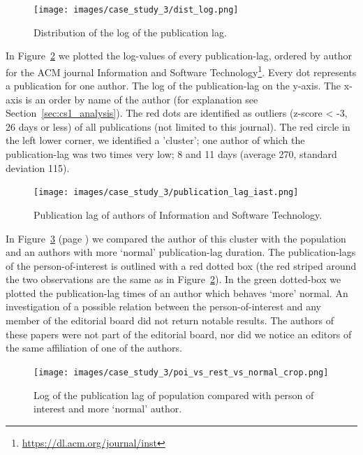 \documentclass{ou-report}
\begin{document}
\begin{figure}[ht]
    \centering
    \texttt{[image: images/case\_study\_3/dist\_log.png]}
    \caption{Distribution of the log of the publication lag.}
    \label{fig:publication_lag_dist_log}
\end{figure}

In Figure~\ref{fig:cs3_publag_iast} we plotted the log-values of every
publication-lag, ordered by author for the ACM journal Information and 
Software Technology\footnote{\url{https://dl.acm.org/journal/inst}}. 
Every dot represents a publication for one author. 
The log
of the publication-lag on the y-axis. The x-axis is an order by name of the
author (for explanation see Section~\ref{sec:cs1_analysis}).
The red dots are identified as outliers (z-score < -3, 26 days or less)
of all publications (not limited to this journal). 
The red circle in the left lower corner, we identified a 'cluster'; one author
of which the publication-lag was two times very low; 8 and 11 days (average
270, standard deviation 115).

\begin{figure}[ht]
    \centering
    \texttt{[image: images/case\_study\_3/publication\_lag\_iast.png]}
    \caption{Publication lag of authors of Information and Software Technology.}
    \label{fig:cs3_publag_iast}
\end{figure}

In Figure~\ref{fig:cs3_pop_vs_poi} (page \pageref{fig:cs3_pop_vs_poi}) we 
compared the author of this cluster with the population and an authors with more 
`normal' publication-lag duration. The publication-lags of the 
person-of-interest is outlined with a red dotted box (the red striped around the 
two observations are the same as in Figure~\ref{fig:cs3_publag_iast}). In the 
green dotted-box we plotted the publication-lag times of an author which behaves 
`more' normal.
An investigation of a possible relation between the person-of-interest and any
member of the editorial board did not return notable results. The authors of
these papers were not part of the editorial board, nor did we notice an editors
of the same affiliation of one of the authors.

\begin{figure}[ht]
    \centering
    \texttt{[image: images/case\_study\_3/poi\_vs\_rest\_vs\_normal\_crop.png]}
    \caption{Log of the publication lag of population compared with person of interest and more `normal' author.}
    \label{fig:cs3_pop_vs_poi}
\end{figure}
\end{document}
